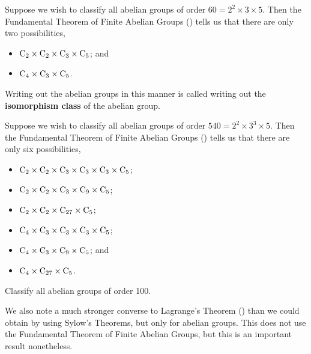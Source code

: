 \begin{example}
    Suppose we wish to classify all abelian groups of order $60 = 2^2 \times 3 \times 5$. Then the Fundamental Theorem of Finite Abelian Groups () tells us that there are only two possibilities,
    \begin{itemize}
        \item $\mathrm{C}_{2} \times \mathrm{C}_{2} \times \mathrm{C}_{3} \times \mathrm{C}_{5}$; and
        \item $\mathrm{C}_{4} \times \mathrm{C}_{3} \times \mathrm{C}_{5}$.
    \end{itemize}
\end{example}

Writing out the abelian groups in this manner is called writing out the \textbf{isomorphism class} of the abelian group.

\begin{example}
    Suppose we wish to classify all abelian groups of order $540 = 2^2 \times 3^3 \times 5$. Then the Fundamental Theorem of Finite Abelian Groups () tells us that there are only six possibilities,
    \begin{multicols}{2}
        \begin{itemize}
            \item $\mathrm{C}_{2} \times \mathrm{C}_{2} \times \mathrm{C}_{3} \times \mathrm{C}_{3} \times \mathrm{C}_{3} \times \mathrm{C}_{5}$;
            \item $\mathrm{C}_{2} \times \mathrm{C}_{2} \times \mathrm{C}_{3} \times \mathrm{C}_{9} \times \mathrm{C}_{5}$;
            \item $\mathrm{C}_{2} \times \mathrm{C}_{2} \times \mathrm{C}_{27} \times \mathrm{C}_{5}$;
            \item $\mathrm{C}_{4} \times \mathrm{C}_{3} \times \mathrm{C}_{3} \times \mathrm{C}_{3} \times \mathrm{C}_{5}$;
            \item $\mathrm{C}_{4} \times \mathrm{C}_{3} \times \mathrm{C}_{9} \times \mathrm{C}_{5}$; and
            \item $\mathrm{C}_{4} \times \mathrm{C}_{27} \times \mathrm{C}_{5}$.
        \end{itemize}
    \end{multicols}
\end{example}

\begin{exercise}
    Classify all abelian groups of order 100.
\end{exercise}

We also note a much stronger converse to Lagrange's Theorem () than we could obtain by using Sylow's Theorems, but only for abelian groups. This does not use the Fundamental Theorem of Finite Abelian Groups, but this is an important result nonetheless.

